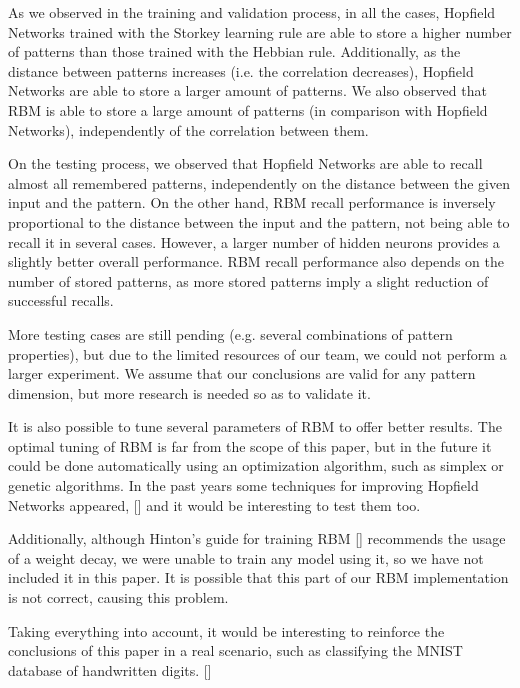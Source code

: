 \documentclass[anon]{CI}
\begin{document}
As we observed in the training and validation process, in all the cases, Hopfield Networks trained with the Storkey learning rule are able to store a higher number of patterns than those trained with the Hebbian rule. Additionally, as the distance between patterns increases (i.e. the correlation decreases), Hopfield Networks are able to store a larger amount of patterns. We also observed that RBM is able to store a large amount of patterns (in comparison with Hopfield Networks), independently of the correlation between them.

On the testing process, we observed that Hopfield Networks are able to recall almost all remembered patterns, independently on the distance between the given input and the pattern. On the other hand, RBM recall performance is inversely proportional to the distance between the input and the pattern, not being able to recall it in several cases. However, a larger number of hidden neurons provides a slightly better overall performance. RBM recall performance also depends on the number of stored patterns, as more stored patterns imply a slight reduction of successful recalls.

More testing cases are still pending (e.g. several combinations of pattern properties), but due to the limited resources of our team, we could not perform a larger experiment. We assume that our conclusions are valid for any pattern dimension, but more research is needed so as to validate it.

It is also possible to tune several parameters of RBM to offer better results. The optimal tuning of RBM is far from the scope of this paper, but in the future it could be done automatically using an optimization algorithm, such as simplex or genetic algorithms. In the past years some techniques for improving Hopfield Networks appeared, [\cite{Paik1992}] and it would be interesting to test them too.

Additionally, although Hinton’s guide for training RBM [\cite{Hinton2012}] recommends the usage of a weight decay, we were unable to train any model using it, so we have not included it in this paper. It is possible that this part of our RBM implementation is not correct, causing this problem.

Taking everything into account, it would be interesting to reinforce the conclusions of this paper in a real scenario, such as classifying the MNIST database of handwritten digits. [\cite{lecun1998mnist}]


\end{document}
